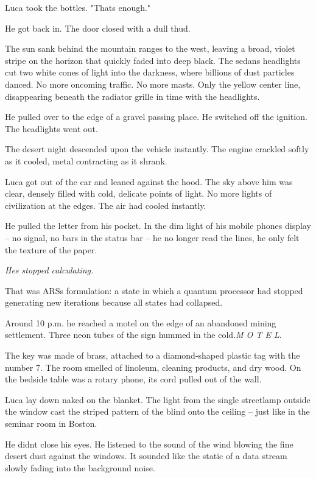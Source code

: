 \documentclass[
  ngerman,
]{article}
\begin{document}
Luca took the bottles. "That\textquotesingle s enough."

He got back in. The door closed with a dull thud.

The sun sank behind the mountain ranges to the west, leaving a broad,
violet stripe on the horizon that quickly faded into deep black. The
sedan\textquotesingle s headlights cut two white cones of light into the
darkness, where billions of dust particles danced. No more oncoming
traffic. No more masts. Only the yellow center line, disappearing
beneath the radiator grille in time with the headlights.

He pulled over to the edge of a gravel passing place. He switched off
the ignition. The headlights went out.

The desert night descended upon the vehicle instantly. The engine
crackled softly as it cooled, metal contracting as it shrank.

Luca got out of the car and leaned against the hood. The sky above him
was clear, densely filled with cold, delicate points of light. No more
lights of civilization at the edges. The air had cooled instantly.

He pulled the letter from his pocket. In the dim light of his mobile
phone\textquotesingle s display -- no signal, no bars in the status bar
-- he no longer read the lines, he only felt the texture of the paper.

\emph{He\textquotesingle s stopped calculating.}

That was ARS\textquotesingle s formulation: a state in which a quantum
processor had stopped generating new iterations because all states had
collapsed.

Around 10 p.m. he reached a motel on the edge of an abandoned mining
settlement. Three neon tubes of the sign hummed in the cold.\emph{M O T
E L}.

The key was made of brass, attached to a diamond-shaped plastic tag with
the number 7. The room smelled of linoleum, cleaning products, and dry
wood. On the bedside table was a rotary phone, its cord pulled out of
the wall.

Luca lay down naked on the blanket. The light from the single streetlamp
outside the window cast the striped pattern of the blind onto the
ceiling -- just like in the seminar room in Boston.

He didn\textquotesingle t close his eyes. He listened to the sound of
the wind blowing the fine desert dust against the windows. It sounded
like the static of a data stream slowly fading into the background
noise.
\end{document}
